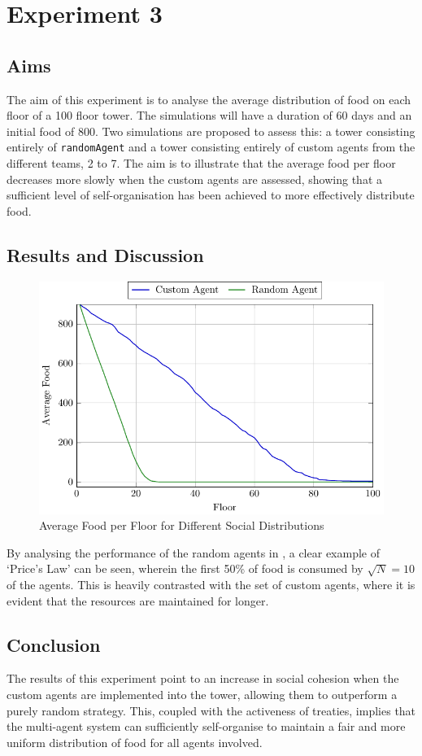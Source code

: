 \section{Experiment 3}
\label{sec: Experiment 3}
\subsection{Aims}
\label{subsec: E3-Aims}
The aim of this experiment is to analyse the average distribution of food on each floor of a 100 floor tower.
The simulations will have a duration of 60 days and an initial food of 800. Two simulations are proposed to assess this: a tower consisting entirely of \texttt{randomAgent} and a tower consisting entirely of custom agents from the different teams, 2 to 7. The aim is to illustrate that the average food per floor decreases more slowly when the custom agents are assessed, showing that a sufficient level of self-organisation has been achieved to more effectively distribute food.

\subsection{Results and Discussion}
\label{subsec: E3-Results and Discussion}
\begin{figure}[H]
    \centering
    \includegraphics[width=.8\linewidth]{images/SOMAS_price.pdf}
    \caption{Average Food per Floor for Different Social Distributions}
    \label{fig:priceLaw}
\end{figure}

By analysing the performance of the random agents in , a clear example of `Price's Law' can be seen, wherein the first 50\% of food is consumed by $\sqrt{\mathit{N}} = 10$ of the agents. This is heavily contrasted with the set of custom agents, where it is evident that the resources are maintained for longer. 

\subsection{Conclusion}
\label{subsec: E3-Conclusion}
The results of this experiment point to an increase in social cohesion when the custom agents are implemented into the tower, allowing them to outperform a purely random strategy. This, coupled with the activeness of treaties, implies that the multi-agent system can sufficiently self-organise to maintain a fair and more uniform distribution of food for all agents involved. 

